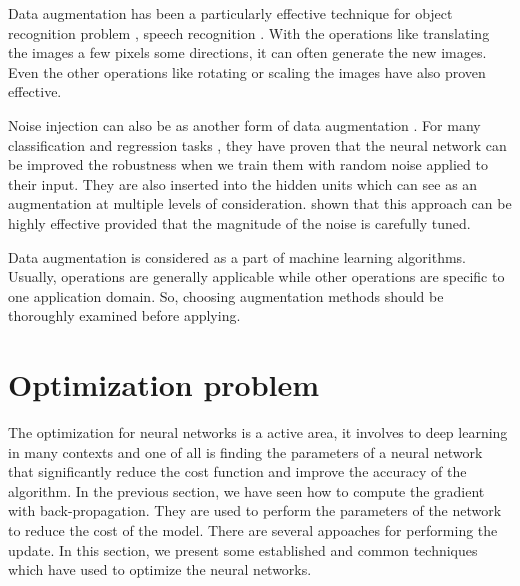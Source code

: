Data augmentation has been a particularly effective technique for object recognition problem \cite{}, speech recognition \cite{}. With the operations like translating the images a few pixels some directions, it can often generate the new images. Even the other operations like rotating or scaling the images have also proven effective.

Noise injection can also be as another form of data augmentation \cite{}. For many classification and regression tasks \cite{}, they have proven that the neural network can be improved the robustness when we train them with random noise applied to their input. They are also inserted into the hidden units which can see as an augmentation at multiple levels of consideration. \cite{} shown that this approach can be highly effective provided that the magnitude of the noise is carefully tuned.

Data augmentation is considered as a part of machine learning algorithms. Usually, operations are generally applicable while other operations are specific to one application domain. So, choosing augmentation methods should be thoroughly examined before applying.

\section{Optimization problem}
The optimization for neural networks is a active area, it involves to deep learning in many contexts and one of all is finding the parameters of a neural network that significantly reduce the cost function and improve the accuracy of the algorithm. In the previous section, we have seen how to compute the gradient with back-propagation. They are used to perform the parameters of the network to reduce the cost of the model. There are several appoaches for performing the update. In this section, we present some established and common techniques which have used to optimize the neural networks.

